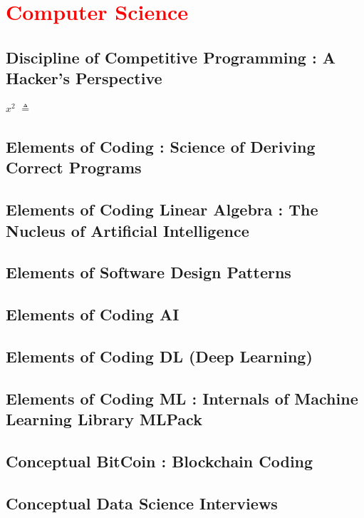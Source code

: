 \documentclass[makeidx, 12pt, oneside, onecolumn, openright, final, svgnames, dvipsnames, extrafontsizes]{memoir}
\theoremstyle{problemstyle}
\begin{document}
\part{\textcolor{red}{Computer Science}}

\chapter{Discipline of Competitive Programming : A Hacker’s Perspective}
$x^2$ $\triangleq$

\chapter{Elements of Coding : Science of Deriving Correct Programs}

\chapter{Elements of Coding Linear Algebra : The Nucleus of Artificial Intelligence}


\chapter{Elements of Software Design Patterns}

\chapter{Elements of Coding AI}

\chapter{Elements of Coding DL (Deep Learning)}

\chapter{Elements of Coding ML : Internals of Machine Learning Library MLPack}

\chapter{Conceptual BitCoin : Blockchain Coding}

\chapter{Conceptual Data Science Interviews}
\end{document}
